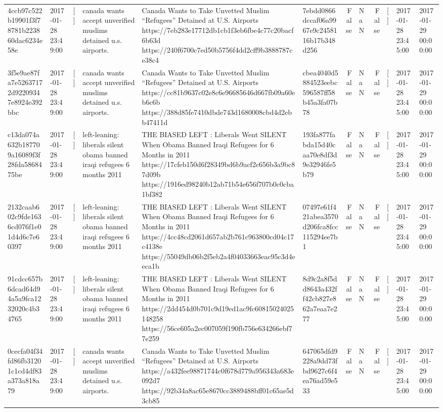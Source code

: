 \begin{tabular}{llllllrlrlll}
4ccb97c522b19901f3f78781b223860dac6234e58e & 2017-01-28 23:49:00 & [] & canada wants accept unverified muslims detained u.s. airports. & Canada Wants to Take Unvetted Muslim “Refugees” Detained at U.S. Airports https://7eb283e17712db1cb1f3eb6fbe4c77c20bacf6b63d https://240f6700c7ed50b5756f4dd2cff9b3888787ce38c4 & 7ebdd0866dccaf06a9967e9c2458116b17b348d256 & False & NaN & False & [] & 2017-01-28 23:45:00 & 2017-01-29 00:00:00 \\
3f5e9ae87fa7e52637172d92209347e8924e392bbc & 2017-01-28 23:49:00 & [] & canada wants accept unverified muslims detained u.s. airports. & Canada Wants to Take Unvetted Muslim “Refugees” Detained at U.S. Airports https://cc81b9637c02e8c6e96685646d667fb09a60eb6c6b https://388d85fe7410dbde743d1680008cbd4d2ebb47411d & cbea4040d5884523eebc596587ff58b45a3fa07b78 & False & NaN & False & [] & 2017-01-28 23:45:00 & 2017-01-29 00:00:00 \\
c13da074a632b187709a16089f3f28fda5868475be & 2017-01-28 23:49:00 & [] & left-leaning: liberals silent obama banned iraqi refugees 6 months 2011 & THE BIASED LEFT : Liberals Went SILENT When Obama Banned Iraqi Refugees for 6 Months in 2011 https://17cfeb150d6f28349bd6b9acf2c656b3a9bc87d09b https://1916ed98240b12ab71b54e656f707b0c0cba1bf382 & 193fa877fabda15d40caa70e8df3d9e32946fe5b79 & False & NaN & False & [] & 2017-01-28 23:45:00 & 2017-01-29 00:00:00 \\
2132caab602c9fde1636cd076f1e01d4d6c7e60397 & 2017-01-28 23:49:00 & [] & left-leaning: liberals silent obama banned iraqi refugees 6 months 2011 & THE BIASED LEFT : Liberals Went SILENT When Obama Banned Iraqi Refugees for 6 Months in 2011 https://4cc48cd2061d657ab2b761c963800cd04c17c4138e https://55049db06b2f5eb2a4f04033663eac95c3d4eeca1b & 07497e61f421abea3570d206fca8fcc115294ee7b1 & False & NaN & False & [] & 2017-01-28 23:45:00 & 2017-01-29 00:00:00 \\
91cdcc657b6dcad64d94a5a9fca1232020c4b34765 & 2017-01-28 23:49:00 & [] & left-leaning: liberals silent obama banned iraqi refugees 6 months 2011 & THE BIASED LEFT : Liberals Went SILENT When Obama Banned Iraqi Refugees for 6 Months in 2011 https://2dd454d0b701c9d19ed1ac9fc60815024025148258 https://56ce605a2ec007059f190fb756e634266ebf77e259 & 8d9c2a8f5dd8643a432ff42cb827e862a7eaa7e277 & False & NaN & False & [] & 2017-01-28 23:45:00 & 2017-01-29 00:00:00 \\
0cecfa04f34fd86fb31201c1cd4df83a373a818a79 & 2017-01-28 23:49:00 & [] & canada wants accept unverified muslims detained u.s. airports. & Canada Wants to Take Unvetted Muslim “Refugees” Detained at U.S. Airports https://a432fee98871744c0f678d779a956343a683e092d7 https://92b34a8ac65e8670cc3889488bff01c65ae5d3cb85 & 647065dfd9228a9dd73fbd9627c6f4ea76ad59e533 & False & NaN & False & [] & 2017-01-28 23:45:00 & 2017-01-29 00:00:00 \\

\end{tabular}
